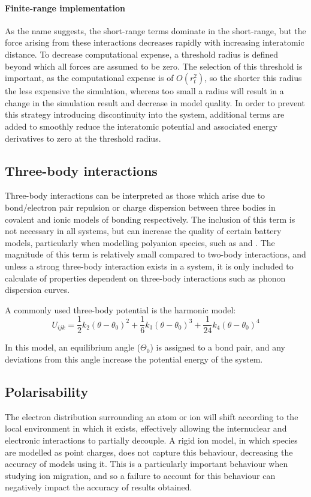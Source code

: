 \paragraph{Finite-range implementation}
As the name suggests, the short-range terms dominate in the short-range, but the force arising from these interactions decreases rapidly with increasing interatomic distance.
To decrease computational expense, a threshold radius is defined beyond which all forces are assumed to be zero.
The selection of this threshold is important, as the computational expense is of $O(r_t^2)$, so the shorter this radius the less expensive the simulation, whereas too small a radius will result in a change in the simulation result and decrease in model quality.
In order to prevent this strategy introducing discontinuity into the system, additional terms are added to smoothly reduce the interatomic potential and associated energy derivatives to zero at the threshold radius. 


\subsection{Three-body interactions}
Three-body interactions can be interpreted as those which arise due to bond/electron pair repulsion or charge dispersion between three bodies in covalent and ionic models of bonding respectively.
The inclusion of this term is not necessary in all systems, but can increase the quality of certain battery models, particularly when modelling polyanion species, such as  and .
The magnitude of this term is relatively small compared to two-body interactions, and unless a strong three-body interaction exists in a system, it is only included to calculate of properties dependent on three-body interactions such as phonon dispersion curves.

A commonly used three-body potential is the harmonic model:
\begin{equation}
  U_{ijk} = \frac{1}{2}k_2(\theta-\theta_0)^2   + \frac{1}{6}k_3(\theta-\theta_0)^3    + \frac{1}{24}k_4(\theta-\theta_0)^4
  \label{eq:threebody}
\end{equation}

In this model, an equilibrium angle ($\Theta_0$) is assigned to a bond pair, and any deviations from this angle increase the potential energy of the system.

\subsection{Polarisability}
The electron distribution surrounding an atom or ion will shift according to the local environment in which it exists, effectively allowing the internuclear and electronic interactions to partially decouple.
A rigid ion model, in which species are modelled as point charges, does not capture this behaviour, decreasing the accuracy of models using it.
This is a particularly important behaviour when studying ion migration, and so a failure to account for this behaviour can negatively impact the accuracy of results obtained.

